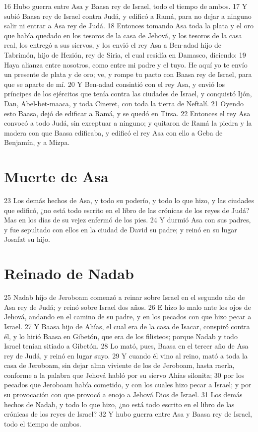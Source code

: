 16 Hubo guerra entre Asa y Baasa rey de Israel, todo el tiempo de ambos.
17 Y subió Baasa rey de Israel contra Judá, y edificó a Ramá, para no dejar a ninguno salir ni entrar a Asa rey de Judá.
18 Entonces tomando Asa toda la plata y el oro que había quedado en los tesoros de la casa de Jehová, y los tesoros de la casa real, los entregó a sus siervos, y los envió el rey Asa a Ben-adad hijo de Tabrimón, hijo de Hezión, rey de Siria, el cual residía en Damasco, diciendo:
19 Haya alianza entre nosotros, como entre mi padre y el tuyo. He aquí yo te envío un presente de plata y de oro; ve, y rompe tu pacto con Baasa rey de Israel, para que se aparte de mí.
20 Y Ben-adad consintió con el rey Asa, y envió los príncipes de los ejércitos que tenía contra las ciudades de Israel, y conquistó Ijón, Dan, Abel-bet-maaca, y toda Cineret, con toda la tierra de Neftalí.
21 Oyendo esto Baasa, dejó de edificar a Ramá, y se quedó en Tirsa.
22 Entonces el rey Asa convocó a todo Judá, sin exceptuar a ninguno; y quitaron de Ramá la piedra y la madera con que Baasa edificaba, y edificó el rey Asa con ello a Geba de Benjamín, y a Mizpa.

\section*{Muerte de Asa}

23 Los demás hechos de Asa, y todo su poderío, y todo lo que hizo, y las ciudades que edificó, ¿no está todo escrito en el libro de las crónicas de los reyes de Judá? Mas en los días de su vejez enfermó de los pies.
24 Y durmió Asa con sus padres, y fue sepultado con ellos en la ciudad de David su padre; y reinó en su lugar Josafat su hijo.

\section*{Reinado de Nadab}

25 Nadab hijo de Jeroboam comenzó a reinar sobre Israel en el segundo año de Asa rey de Judá; y reinó sobre Israel dos años.
26 E hizo lo malo ante los ojos de Jehová, andando en el camino de su padre, y en los pecados con que hizo pecar a Israel.
27 Y Baasa hijo de Ahías, el cual era de la casa de Isacar, conspiró contra él, y lo hirió Baasa en Gibetón, que era de los filisteos; porque Nadab y todo Israel tenían sitiado a Gibetón.
28 Lo mató, pues, Baasa en el tercer año de Asa rey de Judá, y reinó en lugar suyo.
29 Y cuando él vino al reino, mató a toda la casa de Jeroboam, sin dejar alma viviente de los de Jeroboam, hasta raerla, conforme a la palabra que Jehová habló por su siervo Ahías silonita; 
30 por los pecados que Jeroboam había cometido, y con los cuales hizo pecar a Israel; y por su provocación con que provocó a enojo a Jehová Dios de Israel.
31 Los demás hechos de Nadab, y todo lo que hizo, ¿no está todo escrito en el libro de las crónicas de los reyes de Israel?
32 Y hubo guerra entre Asa y Baasa rey de Israel, todo el tiempo de ambos.

